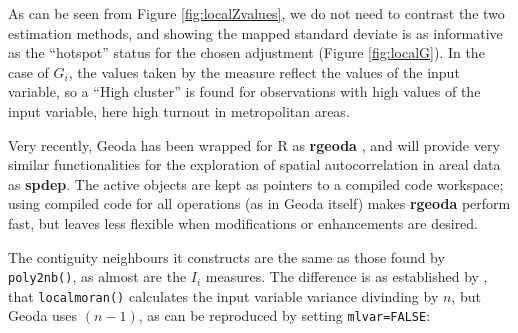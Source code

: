 \documentclass[]{book}
\begin{document}
As can be seen from Figure \ref{fig:localZvalues}, we do not need to contrast the two estimation methods, and showing the mapped standard deviate is as informative as the ``hotspot'' status for the chosen adjustment (Figure \ref{fig:localG}). In the case of \(G_i\), the values taken by the measure reflect the values of the input variable, so a ``High cluster'' is found for observations with high values of the input variable, here high turnout in metropolitan areas.

Very recently, Geoda has been wrapped for R as \textbf{rgeoda} \citep{R-rgeoda}, and will provide very similar functionalities for the exploration of spatial autocorrelation in areal data as \textbf{spdep}. The active objects are kept as pointers to a compiled code workspace; using compiled code for all operations (as in Geoda itself) makes \textbf{rgeoda} perform fast, but leaves less flexible when modifications or enhancements are desired.

The contiguity neighbours it constructs are the same as those found by \texttt{poly2nb()}, as almost are the \(I_i\) measures. The difference is as established by \citet{Bivand2018}, that \texttt{localmoran()} calculates the input variable variance divinding by \(n\), but Geoda uses \((n-1)\), as can be reproduced by setting \texttt{mlvar=FALSE}:
\end{document}

